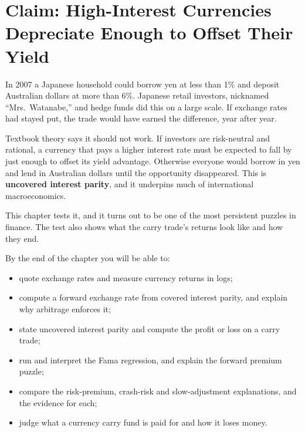 \makeatletter
{}
\makeatother

\chapter{Claim: High-Interest Currencies Depreciate Enough to Offset Their Yield}
\label{ch:18}

In 2007 a Japanese household could borrow yen at less than 1\% and deposit Australian dollars at more than 6\%. Japanese retail investors, nicknamed ``Mrs.\ Watanabe,'' and hedge funds did this on a large scale. If exchange rates had stayed put, the trade would have earned the difference, year after year.

Textbook theory says it should not work. If investors are risk-neutral and rational, a currency that pays a higher interest rate must be expected to fall by just enough to offset its yield advantage. Otherwise everyone would borrow in yen and lend in Australian dollars until the opportunity disappeared. This is \textbf{uncovered interest parity}, and it underpins much of international macroeconomics.

This chapter tests it, and it turns out to be one of the most persistent puzzles in finance. The test also shows what the carry trade's returns look like and how they end.

By the end of the chapter you will be able to:

\begin{itemize}
  \item quote exchange rates and measure currency returns in logs;
  \item compute a forward exchange rate from covered interest parity, and explain why arbitrage enforces it;
  \item state uncovered interest parity and compute the profit or loss on a carry trade;
  \item run and interpret the Fama regression, and explain the forward premium puzzle;
  \item compare the risk-premium, crash-risk and slow-adjustment explanations, and the evidence for each;
  \item judge what a currency carry fund is paid for and how it loses money.
\end{itemize}

